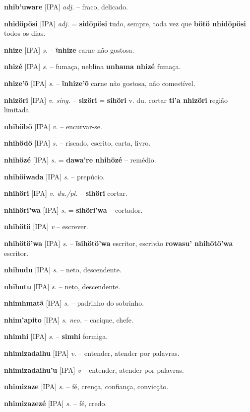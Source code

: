 \textbf{nhib'uware} [IPA] \textit{adj.} -- fraco, delicado.

\textbf{nhidöpösi} [IPA] \textit{adj.} = \textbf{sidöpösi} tudo, sempre, toda vez que  \textbf{bötö nhidöpösi} todos os dias.

\textbf{nhize} [IPA] \textit{s.} -- \textbf{ĩnhize} carne não gostosa.

\textbf{nhizé} [IPA] \textit{s.} -- fumaça, neblina  \textbf{unhama nhizé} fumaça.

\textbf{nhize'õ} [IPA] \textit{s.} -- \textbf{ĩnhize'õ} carne não gostosa, não comestível.

\textbf{nhizöri} [IPA] \textit{v. sing.} -- \textbf{sizöri} = \textbf{sihöri} v. du. cortar  \textbf{ti'a nhizöri} região limitada.

\textbf{nhihöbö} [IPA] \textit{v.} -- encurvar-se.

\textbf{nhihödö} [IPA] \textit{s.} -- riscado, escrito, carta, livro.

\textbf{nhihözé} [IPA] \textit{s.} = \textbf{dawa're nhihözé} -- remédio.

\textbf{nhihöiwada} [IPA] \textit{s.} -- prepúcio.

\textbf{nhihöri} [IPA] \textit{v. du./pl.} -- \textbf{sihöri} cortar.

\textbf{nhihöri'wa} [IPA] \textit{s.} = \textbf{sihöri'wa} -- cortador.

\textbf{nhihötö} [IPA] \textit{v} -- escrever.

\textbf{nhihötö'wa} [IPA] \textit{s.} -- \textbf{ĩsihötö'wa} escritor, escrivão  \textbf{rowasu' nhihötö'wa} escritor.

\textbf{nhihudu} [IPA] \textit{s.} -- neto, descendente.

\textbf{nhihutu} [IPA] \textit{s.} -- neto, descendente.

\textbf{nhimhmatã} [IPA] \textit{s.} -- padrinho do sobrinho.

\textbf{nhim'apito} [IPA] \textit{s. neo.} -- cacique, chefe.

\textbf{nhimhi} [IPA] \textit{s.} -- \textbf{simhi} formiga.

\textbf{nhimizadaihu} [IPA] \textit{v.} -- entender, atender por palavras.

\textbf{nhimizadaihu'u} [IPA] \textit{v} -- entender, atender por palavras.

\textbf{nhimizaze} [IPA] \textit{s.} -- fé, crença, confiança, convicção.

\textbf{nhimizazezé} [IPA] \textit{s.} -- fé, credo.

